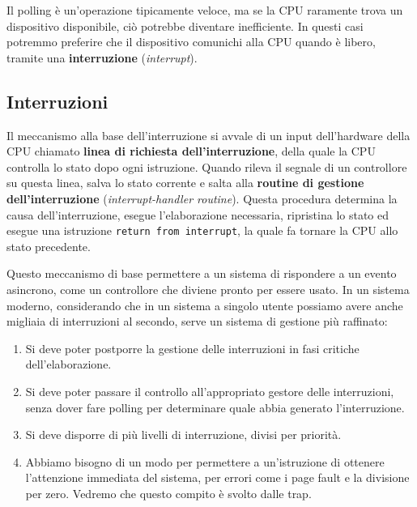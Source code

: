         Il polling è un'operazione tipicamente veloce, ma se la CPU raramente trova un dispositivo disponibile, ciò potrebbe diventare inefficiente. In questi casi potremmo preferire che il dispositivo comunichi alla CPU quando è libero, tramite una \textbf{interruzione} (\textit{interrupt}).
        
    \subsection{Interruzioni}
        Il meccanismo alla base dell'interruzione si avvale di un input dell'hardware della CPU chiamato \textbf{linea di richiesta dell'interruzione}, della quale la CPU controlla lo stato dopo ogni istruzione. Quando rileva il segnale di un controllore su questa linea, salva lo stato corrente e salta alla \textbf{routine di gestione dell'interruzione} (\textit{interrupt-handler routine}). Questa procedura determina la causa dell'interruzione, esegue l'elaborazione necessaria, ripristina lo stato ed esegue una istruzione \texttt{return from interrupt}, la quale fa tornare la CPU allo stato precedente.
        
        Questo meccanismo di base permettere a un sistema di rispondere a un evento asincrono, come un controllore che diviene pronto per essere usato. In un sistema moderno, considerando che in un sistema a singolo utente possiamo avere anche migliaia di interruzioni al secondo, serve un sistema di gestione più raffinato:
        \begin{enumerate}
            \item Si deve poter postporre la gestione delle interruzioni in fasi critiche dell'elaborazione.
            
            \item Si deve poter passare il controllo all'appropriato gestore delle interruzioni, senza dover fare polling per determinare quale abbia generato l'interruzione.
            
            \item Si deve disporre di più livelli di interruzione, divisi per priorità.
            
            \item Abbiamo bisogno di un modo per permettere a un'istruzione di ottenere l'attenzione immediata del sistema, per errori come i page fault e la divisione per zero. Vedremo che questo compito è svolto dalle trap.
        \end{enumerate}
        
